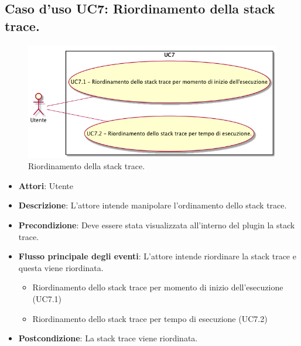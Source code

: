 \subsection{Caso d'uso UC7: Riordinamento della stack trace.}
\begin{figure} [H]
\centering
\includegraphics[scale=0.45]{./UC/UC7.png}
\caption{Riordinamento della stack trace.}\label{}
\end{figure}
\begin{itemize}
\item \textbf{Attori}: Utente
\item \textbf{Descrizione}: L'attore intende manipolare l'ordinamento dello stack trace.

\item \textbf{Precondizione}: Deve essere stata visualizzata all'interno del plugin la stack trace.

\item \textbf{Flusso principale degli eventi}: L'attore intende riordinare la stack trace e questa viene riordinata.
\begin{itemize}
\item Riordinamento dello stack trace per momento di inizio dell'esecuzione (UC7.1)
\item Riordinamento dello stack trace per tempo di esecuzione (UC7.2)
\end{itemize}
\item \textbf{Postcondizione}: La stack trace viene riordinata. 
\end{itemize}
